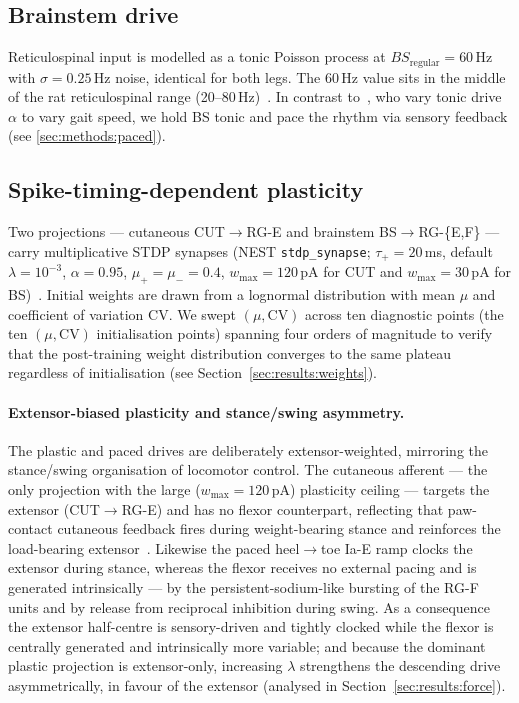 \subsection{Brainstem drive}\label{sec:methods:bs}
Reticulospinal input is modelled as a tonic Poisson process at
$BS_{\text{regular}}=60$\,Hz with $\sigma=0.25$\,Hz noise, identical for
both legs. The 60\,Hz value sits in the
middle of the rat reticulospinal range
(20--80\,Hz)~\cite{drew1986,brocard2010}. In contrast to~\cite{zhang2022},
who vary tonic drive $\alpha$ to vary gait speed, we hold BS tonic and
pace the rhythm via sensory feedback (see \autoref{sec:methods:paced}).

\subsection{Spike-timing-dependent plasticity}\label{sec:methods:stdp}
Two projections --- cutaneous CUT$\to$RG-E and brainstem
BS$\to$RG-\{E,F\} --- carry multiplicative STDP synapses (NEST
\verb|stdp_synapse|; $\tau_+=20$\,ms, default $\lambda=10^{-3}$,
$\alpha=0.95$, $\mu_+=\mu_-=0.4$, $w_{\max}=120$\,pA for CUT and
$w_{\max}=30$\,pA for BS)~\cite{biPoo1998,morrison2007}. Initial
weights are drawn from a lognormal distribution with mean $\mu$ and
coefficient of variation CV. We swept $(\mu,\text{CV})$ across ten
diagnostic points (the ten $(\mu,\mathrm{CV})$ initialisation points) spanning four orders of
magnitude to verify that the post-training weight distribution
converges to the same plateau regardless of initialisation (see
Section~\ref{sec:results:weights}).

\paragraph{Extensor-biased plasticity and stance/swing asymmetry.}
The plastic and paced drives are deliberately extensor-weighted, mirroring
the stance/swing organisation of locomotor control. The cutaneous
afferent --- the only projection with the large ($w_{\max}=120$\,pA)
plasticity ceiling --- targets the extensor (CUT$\to$RG-E) and has no
flexor counterpart, reflecting that paw-contact cutaneous feedback fires
during weight-bearing stance and reinforces the load-bearing
extensor~\cite{pearson1995,rossignol2006}. Likewise the paced
heel$\to$toe Ia-E ramp clocks the extensor during stance, whereas the
flexor receives no external pacing and is generated intrinsically ---
by the persistent-sodium-like bursting of the RG-F units and by release
from reciprocal inhibition during swing. As a consequence the extensor
half-centre is sensory-driven and tightly clocked while the flexor is
centrally generated and intrinsically more variable; and because the
dominant plastic projection is extensor-only, increasing $\lambda$
strengthens the descending drive asymmetrically, in favour of the
extensor (analysed in Section~\ref{sec:results:force}).

